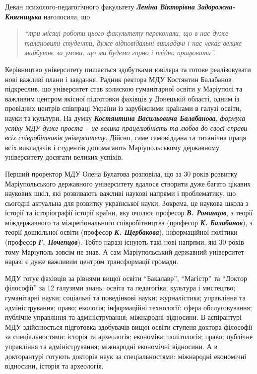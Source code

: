 Декан психолого-педагогічного факультету \emph{\textbf{Леніна Вікторівна Задорожна-Княгницька}}
наголосила, що 
\begin{quote}
\em\enquote{три місяці роботи цього факультету переконали, що в нас дуже
талановиті студенти, дуже відповідальні викладачі і нас чекає велике майбутнє
за умови, що ми будемо гарно і плідно працювати}.
\end{quote}

Керівництво університету пишається здобутками ювіляра та готове реалізовувати
нові важливі плани і завдання. Радник ректора МДУ Костянтин Балабанов
підкреслив, що університет став колискою гуманітарної освіти у Маріуполі та
важливим центром якісної підготовки фахівців у Донецькій області, одним із
провідних центрів співпраці України із зарубіжними країнами в галузі освіти,
науки та культури. На думку \emph{\textbf{Костянтина Васильовича Балабанова}}, \emph{формула успіху
МДУ дуже проста – це велика працелюбність та любов до своєї справи всіх
співробітників університету}. Дійсно, саме самовіддана та титанічна праця всіх
викладачів і студентів допомагають Маріупольському державному університету
досягати великих успіхів.

Перший проректор МДУ Олена Булатова розповіла, що за 30 років розвитку
Маріупольського державного університету вдалося створити дуже багато цікавих
наукових шкіл, які розвивають важливі наукові напрями і проблематику, що
сьогодні актуальна для розвитку української науки. Зокрема, це наукова школа з
історії та історіографії історії країни, яку очолює професор \emph{\textbf{В. Романцов}}, з
теорії міждержавного та міжрегіонального співробітництва (професор \emph{\textbf{К.
Балабанов}}), з теорії дошкільної освіти (професор \textbf{\emph{К. Щербакова}}), інформаційної
політики (професор \emph{\textbf{Г. Почепцов}}). Тобто наразі існують такі нові напрями, які 30
років тому Маріуполь зовсім не знав. А сам Маріупольський державний університет
наразі є дуже важливим центром трансформації громади.


МДУ готує фахівців за рівнями вищої освіти \enquote{Бакалавр}, \enquote{Магістр} та \enquote{Доктор
філософії} за 12 галузями знань: освіта та педагогіка; культура і мистецтво;
гуманітарні науки; соціальні та поведінкові науки; журналістика; управління та
адміністрування; право; екологія; інформаційні технології; сфера
обслуговування; публічне управління та адміністрування; міжнародні відносини. В
аспірантурі МДУ здійснюється підготовка здобувачів вищої освіти ступеня доктора
філософії за спеціальностями: історія та археологія; економіка; політологія;
право; публічне управління та адміністрування; міжнародні економічні відносини.
А в докторантурі готують докторів наук за спеціальностями: міжнародні
економічні відносини, історія та археологія.

